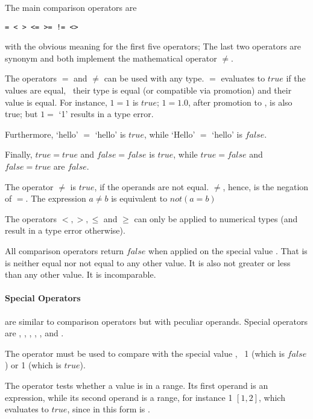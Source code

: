 The main comparison operators are
\begin{verbatim}
= < > <= >= != <>
\end{verbatim}
with the obvious meaning for
the first five operators;
The last two operators
are synonym and both implement
the mathematical operator $\neq$.

The operators $=$ and $\neq$ can be used
with any type. $=$ evaluates to $true$
if the values are equal, \ie\
their type is equal (or compatible
via promotion) and their value
is equal. For instance,
$1 = 1$ is $true$;
$1 = 1.0$, after promotion to ,
is also true; but
$1 =$ `1' results in a type error.

Furthermore, `hello' $=$ `hello'
is $true$, while `Hello' $=$ `hello'
is $false$.

Finally, $true = true$ and
$false = false$ is $true$, while
$true = false$ and $false = true$ are
$false$.

The operator $\neq$ is $true$,
if the operands are not equal.
$\neq$, hence, is the negation
of $=$. The expression $a\neq b$ is equivalent to
$not (a=b)$

The  operators
$<,>,\le$ and $\ge$ can only be applied
to numerical types (and result in a
type error otherwise).

All comparison operators return $false$
when applied on the special value .
That is \acronym{null} is neither equal nor
not equal to any other value. It is also
not greater or less than any other value.
It is incomparable. 

\paragraph{Special Operators}
are similar to comparison operators
but with peculiar operands.
Special operators are
,
,
,
,
,
 and
.


The operator  must be used
to compare with the special value
, \eg\ 1 
(which is $false$) 
or 1 
(which is $true$).

The operator  tests
whether a value is in a range.
Its first operand is an expression,
while its second operand is a range,
for instance
1  $[1,2]$,
which evaluates to $true$,
since  in this form is
.

